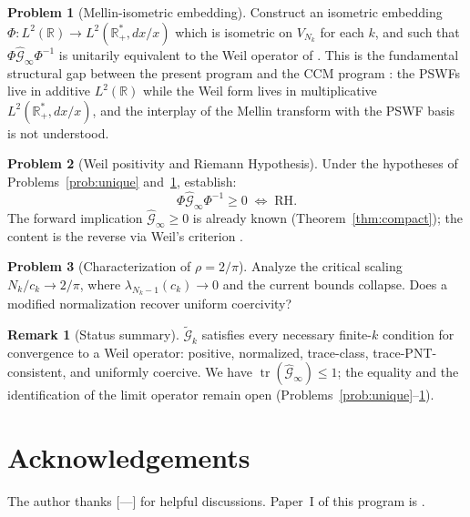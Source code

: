 \documentclass[12pt,a4paper]{amsart}
\theoremstyle{definition}
\newtheorem{remark}[theorem]{Remark}
\newtheorem{problem}{Problem}[section]
\newcommand{\Gcal}{\widehat{\mathcal{G}}}
\begin{document}
\begin{problem}[Mellin-isometric embedding]\label{prob:mellin}
Construct an isometric embedding
$\Phi:L^2(\mathbb{R})\to L^2(\mathbb{R}^*_+,dx/x)$
which is isometric on $V_{N_k}$ for each $k$, and such that
$\Phi\Gcal_\infty\Phi^{-1}$ is unitarily equivalent to the
Weil operator of \cite{CCM2025}.
This is the fundamental structural gap between the present
program and the CCM program \cite{CCM2025}: the PSWFs live in
additive $L^2(\mathbb{R})$ while the Weil form lives in
multiplicative $L^2(\mathbb{R}^*_+,dx/x)$, and the interplay
of the Mellin transform with the PSWF basis is not understood.
\end{problem}

\begin{problem}[Weil positivity and Riemann Hypothesis]
\label{prob:positivity}
Under the hypotheses of Problems~\ref{prob:unique}
and~\ref{prob:mellin}, establish:
\[
  \Phi\Gcal_\infty\Phi^{-1}\geq0
  \;\Longleftrightarrow\;
  \text{RH}.
\]
The forward implication $\Gcal_\infty\geq0$ is already
known (Theorem~\ref{thm:compact});
the content is the reverse via Weil's criterion \cite{Weil1952}.
\end{problem}

\begin{problem}[Characterization of $\rho=2/\pi$]
\label{prob:critical}
Analyze the critical scaling $N_k/c_k\to2/\pi$, where
$\lambda_{N_k-1}(c_k)\to0$ and the current bounds collapse.
Does a modified normalization recover uniform coercivity?
\end{problem}

\begin{remark}[Status summary]
$\widetilde{\mathcal{G}}_k$ satisfies every necessary finite-$k$
condition for convergence to a Weil operator: positive,
normalized, trace-class, trace-PNT-consistent, and uniformly
coercive. We have $\operatorname{tr}(\Gcal_\infty)\leq1$;
the equality and the identification of the limit operator remain
open (Problems~\ref{prob:unique}--\ref{prob:mellin}).
\end{remark}

\section*{Acknowledgements}
The author thanks [---] for helpful discussions.
Paper~I of this program is \cite{PaperI}.
\end{document}
